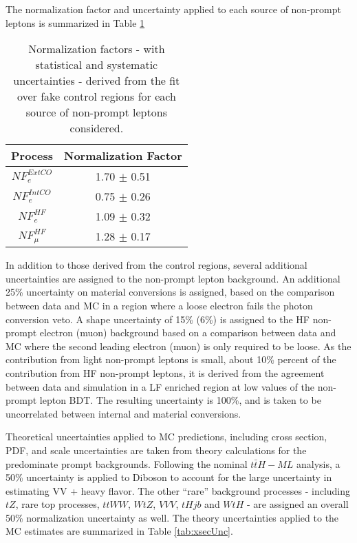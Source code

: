 The normalization factor and uncertainty applied to each source of non-prompt leptons is summarized in Table \ref{tab:fakeNF}

\begin{table}[H]
\begin{center}
\begin{tabular}{c|c}
\hline\hline
Process &  Normalization Factor\\
\hline
$NF_e^{ExtCO}$ & 1.70 $\pm$ 0.51 \\
$NF_e^{IntCO}$ & 0.75 $\pm$ 0.26 \\
$NF_e^{HF}$ & 1.09 $\pm$ 0.32 \\
$NF_{\mu}^{HF}$ & 1.28 $\pm$ 0.17 \\
\hline
\end{tabular}
\label{tab:fakeNF}
\caption{Normalization factors - with statistical and systematic uncertainties - derived from the fit over fake control regions for each source of non-prompt leptons considered.}
\end{center}
\end{table}


In addition to those derived from the control regions, several additional uncertainties are assigned to the non-prompt lepton background. An additional 25\% uncertainty on material conversions is assigned, based on the comparison between data and MC in a region where a loose electron fails the photon conversion veto. A shape uncertainty of 15\% (6\%) is assigned to the HF non-prompt electron (muon) background based on a comparison between data and MC where the second leading electron (muon) is only required to be loose. As the contribution from light non-prompt leptons is small, about 10\% percent of the contribution from HF non-prompt leptons, it is derived from the agreement between data and simulation in a LF enriched region at low values of the non-prompt lepton BDT. The resulting uncertainty is 100\%, and is taken to be uncorrelated between internal and material conversions.

Theoretical uncertainties applied to MC predictions, including cross section, PDF, and scale uncertainties are taken from theory calculations for the predominate prompt backgrounds. Following the nominal $t\bar{t}H-ML$ analysis, a 50\% uncertainty is applied to Diboson to account for the large uncertainty in estimating VV + heavy flavor. The other ``rare'' background processes - including $tZ$, rare top processes, $ttWW$, $WtZ$, $VVV$, $tHjb$ and $WtH$ - are assigned an overall 50\% normalization uncertainty as well. The theory uncertainties applied to the MC estimates are summarized in Table \ref{tab:xsecUnc}.

